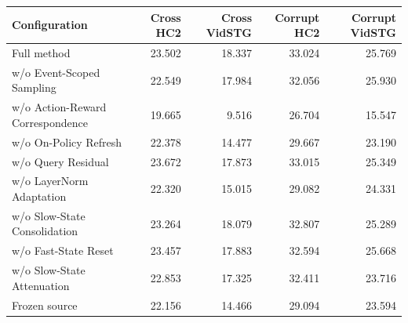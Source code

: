\begin{tabular}{lrrrr}
\toprule
Configuration & Cross HC2 & Cross VidSTG & Corrupt HC2 & Corrupt VidSTG \\
\midrule
Full method & 23.502 & 18.337 & 33.024 & 25.769 \\
w/o Event-Scoped Sampling & 22.549 & 17.984 & 32.056 & 25.930 \\
w/o Action-Reward Correspondence & 19.665 & 9.516 & 26.704 & 15.547 \\
w/o On-Policy Refresh & 22.378 & 14.477 & 29.667 & 23.190 \\
w/o Query Residual & 23.672 & 17.873 & 33.015 & 25.349 \\
w/o LayerNorm Adaptation & 22.320 & 15.015 & 29.082 & 24.331 \\
w/o Slow-State Consolidation & 23.264 & 18.079 & 32.807 & 25.289 \\
w/o Fast-State Reset & 23.457 & 17.883 & 32.594 & 25.668 \\
w/o Slow-State Attenuation & 22.853 & 17.325 & 32.411 & 23.716 \\
Frozen source & 22.156 & 14.466 & 29.094 & 23.594 \\
\bottomrule
\end{tabular}
